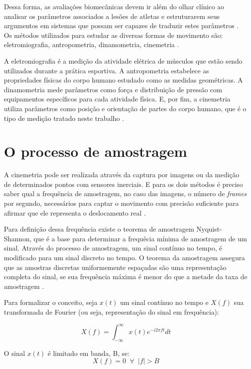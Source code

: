 Dessa forma, as avaliações biomecânicas devem ir além do olhar clínico ao analisar os parâmetros associados a lesões de atletas e estruturarem seus argumentos em sistemas que possam ser capazes de traduzir estes parâmetros \cite{miziara2014}. Os métodos utilizados para estudar as diversas formas de movimento são: eletromiografia, antropometria, dinamometria, cinemetria \cite{amadio2007}.

A eletromiografia é a medição da atividade elétrica de músculos que estão sendo utilizados durante a prática esportiva. A antropometria estabelece as propriedades físicas do corpo humano estudado como as medidas geométricas. A dinamometria mede parâmetros como força e distribuição de pressão com equipamentos específicos para cada atividade física. E, por fim, a cinemetria utiliza parâmetros como posição e orientação de partes do corpo humano, que é o tipo de medição tratado neste trabalho \cite{amadio2007}\cite{medeiros2013}.

\section{O processo de amostragem}
 
A cinemetria pode ser realizada através da captura por imagens ou da medição de determinados pontos com sensores inerciais. E para os dois métodos é preciso saber qual a frequência de amostragem, no caso das imagens, o número de \textit{frames} por segundo, necessários para captar o movimento com precisão suficiente para afirmar que ele representa o deslocamento real \cite{amadio2007}.

Para definição dessa frequência existe o teorema de amostragem Nyquist-Shannon, que é a base para determinar a frequêcia mínima de amostragem de um sinal. Através do processo de amostragem, um sinal contínuo no tempo, é modificado para um sinal discreto no tempo. O teorema da amostragem assegura que as amostras discretas uniformemente espaçadas são uma representação completa do sinal, se sua frequência máxima é menor do que a metade da taxa de amostragem \cite{madeiro2011}.  

Para formalizar o conceito, seja $ x(t) $ um sinal contínuo no tempo e $ X(f) $ sua transformada de Fourier (ou seja, representação do sinal em frequência):

\begin{equation}
 X(f) = \int^{\infty}_{-\infty} x(t)e^{-i2\pi ft}dt 
\end{equation}

O sinal $x(t)$ é limitado em banda, B, se:
\begin{equation}
X(f) = 0 \; \;\forall \; \; |f|>B
\end{equation}

